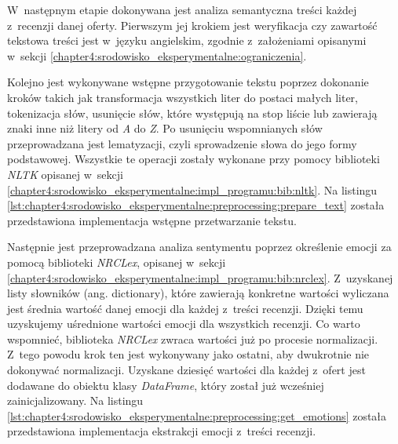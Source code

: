 \documentclass[../Kamil_Kowalewski_Main.tex]{subfiles}
\begin{document}
{{        W~następnym etapie dokonywana jest analiza semantyczna treści każdej z~recenzji
        danej oferty. Pierwszym jej krokiem jest weryfikacja czy zawartość tekstowa
        treści jest w~języku angielskim, zgodnie z~założeniami opisanymi w~sekcji
        \ref{chapter4:srodowisko_eksperymentalne:ograniczenia}.

        Kolejno jest wykonywane wstępne przygotowanie tekstu poprzez dokonanie kroków
        takich jak transformacja wszystkich liter do postaci małych liter, tokenizacja
        słów, usunięcie słów, które występują na stop liście lub zawierają znaki inne
        niż litery od \textit{A} do \textit{Z}. Po usunięciu wspomnianych słów
        przeprowadzana jest lematyzacji, czyli sprowadzenie słowa do jego formy
        podstawowej. Wszystkie te operacji zostały wykonane przy pomocy biblioteki
        \textit{NLTK} opisanej w~sekcji
        \ref{chapter4:srodowisko_eksperymentalne:impl_programu:bib:nltk}. Na listingu
        \ref{lst:chapter4:srodowisko_eksperymentalne:preprocessing:prepare_text}
        została przedstawiona implementacja wstępne przetwarzanie tekstu.


        Następnie jest przeprowadzana analiza sentymentu poprzez określenie emocji za
        pomocą biblioteki \textit{NRCLex}, opisanej w~sekcji
        \ref{chapter4:srodowisko_eksperymentalne:impl_programu:bib:nrclex}. Z~uzyskanej
        listy słowników (ang. dictionary), które zawierają konkretne wartości wyliczana
        jest średnia wartość danej emocji dla każdej z~treści recenzji. Dzięki temu
        uzyskujemy uśrednione wartości emocji dla wszystkich recenzji. Co warto
        wspomnieć, biblioteka \textit{NRCLex} zwraca wartości już po procesie
        normalizacji. Z~tego powodu krok ten jest wykonywany jako ostatni, aby
        dwukrotnie nie dokonywać normalizacji. Uzyskane dziesięć wartości dla każdej
        z~ofert jest dodawane do obiektu klasy \textit{DataFrame}, który został już
        wcześniej zainicjalizowany. Na listingu
        \ref{lst:chapter4:srodowisko_eksperymentalne:preprocessing:get_emotions}
        została przedstawiona implementacja ekstrakcji emocji z~treści recenzji.

}}
\end{document}
